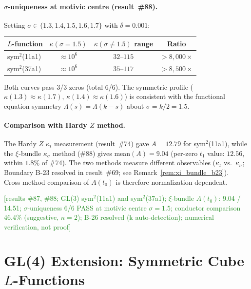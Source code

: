 \documentclass[11pt, a4paper]{article}
\theoremstyle{definition}
\theoremstyle{plain}
\begin{document}
\paragraph{$\sigma$-uniqueness at motivic centre (result~\#88).}
Setting $\sigma \in \{1.3, 1.4, 1.5, 1.6, 1.7\}$ with $\delta = 0.001$:

\begin{center}
\small
\begin{tabular}{@{}lccc@{}}
\toprule
$L$-function & $\kappa(\sigma{=}1.5)$ & $\kappa(\sigma{\neq}1.5)$ range & Ratio \\
\midrule
sym$^2$(11a1) & $\approx 10^6$ & $32$--$115$ & $> 8{,}000\times$ \\
sym$^2$(37a1) & $\approx 10^6$ & $35$--$117$ & $> 8{,}500\times$ \\
\bottomrule
\end{tabular}
\end{center}

Both curves pass 3/3 zeros (total 6/6).  The symmetric profile
($\kappa(1.3) \approx \kappa(1.7)$, $\kappa(1.4) \approx \kappa(1.6)$)
is consistent with the functional equation symmetry $\Lambda(s) = \Lambda(k{-}s)$
about $\sigma = k/2 = 1.5$.

\paragraph{Comparison with Hardy $Z$ method.}
The Hardy $Z$ $\kappa_t$ measurement (result~\#74) gave $A = 12.79$ for sym$^2$(11a1),
while the $\xi$-bundle $\kappa_\sigma$ method (\#88) gives mean$(A) = 9.04$
(per-zero $t_1$ value: $12.56$, within $1.8\%$ of \#74).
The two methods measure different observables ($\kappa_t$ vs.\ $\kappa_\sigma$;
Boundary B-23 resolved in result~\#69; see Remark~\ref{rem:xi_bundle_b23}).
Cross-method comparison of $A(t_0)$ is therefore normalization-dependent.

\textcolor{ForestGreen}{[results \#87, \#88; GL(3) sym$^2$(11a1) and sym$^2$(37a1);
$\xi$-bundle $A(t_0)$: 9.04 / 14.51; $\sigma$-uniqueness 6/6 PASS at motivic centre $\sigma{=}1.5$;
conductor comparison 46.4\% (suggestive, $n{=}2$); B-26 resolved (k auto-detection);
numerical verification, not proof]}


\section{GL(4) Extension: Symmetric Cube $L$-Functions}
\label{sec:gl4_extension}
\end{document}
